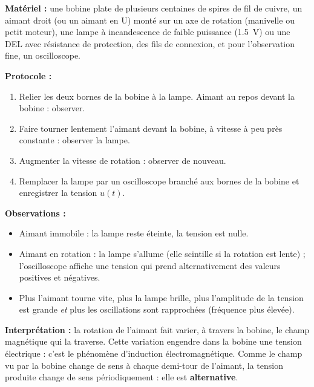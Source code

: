 \documentclass[11pt]{article}
\newcommand{\cle}[1]{{\popxbold\color{popdark}#1}}
\begin{document}
\begin{experience}
\textbf{Matériel :} une bobine plate de plusieurs centaines de spires de fil de cuivre, un aimant droit (ou un aimant en U) monté sur un axe de rotation (manivelle ou petit moteur), une lampe à incandescence de faible puissance (\SI{1.5}{V}) ou une DEL avec résistance de protection, des fils de connexion, et pour l'observation fine, un oscilloscope.

\textbf{Protocole :}
\begin{enumerate}
\item Relier les deux bornes de la bobine à la lampe. Aimant au repos devant la bobine : observer.
\item Faire tourner lentement l'aimant devant la bobine, à vitesse à peu près constante : observer la lampe.
\item Augmenter la vitesse de rotation : observer de nouveau.
\item Remplacer la lampe par un oscilloscope branché aux bornes de la bobine et enregistrer la tension $u(t)$.
\end{enumerate}

\textbf{Observations :}
\begin{itemize}
\item Aimant immobile : la lampe reste éteinte, la tension est nulle.
\item Aimant en rotation : la lampe s'allume (elle scintille si la rotation est lente) ; l'oscilloscope affiche une tension qui prend alternativement des valeurs positives et négatives.
\item Plus l'aimant tourne vite, plus la lampe brille, plus l'amplitude de la tension est grande \emph{et} plus les oscillations sont rapprochées (fréquence plus élevée).
\end{itemize}

\textbf{Interprétation :} la rotation de l'aimant fait varier, à travers la bobine, le champ magnétique qui la traverse. Cette variation engendre dans la bobine une tension électrique : c'est le phénomène d'\cle{induction électromagnétique}. Comme le champ vu par la bobine change de sens à chaque demi-tour de l'aimant, la tension produite change de sens périodiquement : elle est \textbf{alternative}.
\end{experience}
\end{document}
